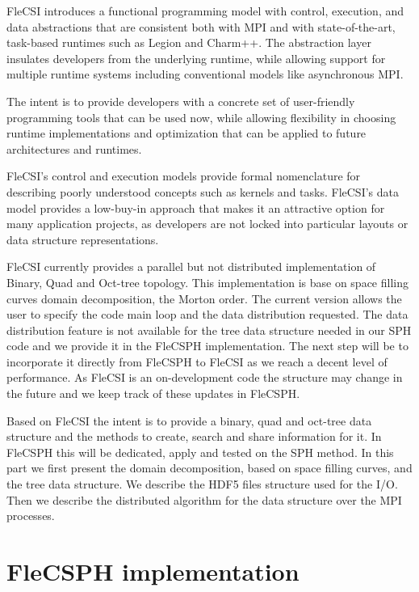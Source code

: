 FleCSI introduces a functional programming model with control, execution, and data abstractions that are consistent both with MPI and with state-of-the-art, task-based runtimes such as Legion\cite{bauer2012legion} and Charm++\cite{kale1993charm++}. 
The abstraction layer insulates developers from the underlying runtime, while allowing support for multiple runtime systems including conventional models like asynchronous MPI.

The intent is to provide developers with a concrete set of user-friendly programming tools that can be used now, while allowing flexibility in choosing runtime implementations and optimization that can be applied to future architectures and runtimes.

FleCSI's control and execution models provide formal nomenclature for describing poorly understood concepts such as kernels and tasks. 
FleCSI's data model provides a low-buy-in approach that makes it an attractive option for many application projects, as developers are not locked into particular layouts or data structure representations.

FleCSI currently provides a parallel but not distributed implementation of Binary, Quad and Oct-tree topology. 
This implementation is base on space filling curves domain decomposition, the Morton order. 
The current version allows the user to specify the code main loop and the data distribution requested. 
The data distribution feature is not available for the tree data structure needed in our SPH code and we provide it in the FleCSPH implementation. 
The next step will be to incorporate it directly from FleCSPH to FleCSI as we reach a decent level of performance.
As FleCSI is an on-development code the structure may change in the future and we keep track of these updates in FleCSPH.

Based on FleCSI the intent is to provide a binary, quad and oct-tree data structure and the methods to create, search and share information for it. 
In FleCSPH this will be dedicated, apply and tested on the SPH method. 
In this part we first present the domain decomposition, based on space filling curves, and the tree data structure.
We describe the HDF5 files structure used for the I/O.
Then we describe the distributed algorithm for the data structure over the MPI processes. 

\section{FleCSPH implementation}

